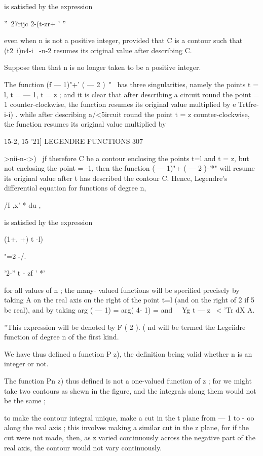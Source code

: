 {is satisfied by the expression

''~27rijc 2-(t-zr+ ' ''

even when n is not a positive integer, provided that C is a contour
such that (t2\ i)n4-i \ -n-2 resumes its original value after
describing C.

Suppose then that n is no longer taken to be a positive integer.

The function (f — 1)"+' ( — 2 )~"~ has three singularities, namely the
points t = l, t = — 1, t = z ; and it is clear that after describing a
circuit round the point = 1 counter-clockwise, the function resumes
its original value multiplied by e Trtfre-i-i) . while after
describing a/<5ircuit round the point t = z counter-clockwise, the
function resumes its original value multiplied by



15-2, 15 '21] LEGENDRE FUNCTIONS 307

  >nii-n-:>) \ jf therefore C be a contour enclosing the points t=l
and t = z, but not enclosing the point = -1, then the function ( —
1)"+ ( — 2 )-'*" will resume its original value after t has described
the contour C. Hence, Legendre's differential equation for functions
of degree n,

/I ,x' * du ,

is satisfied hy the expression

(1+, +) t -l)



"=2 -/.



  '2-'' t - zf ' *'

for all values of n ; the many- valued functions will be specified
precisely by taking A on the real axis on the right of the point t=l
(and on the right of 2 if 5 be real), and by taking arg ( — 1) = arg(
4- 1) = and \ \ Yg t — z \ < 'Tr dX A.

''This expression will be denoted by F ( 2 ). ( nd will be termed the
Legeiidre function of degree n of the first kind.

We have thus defined a function P z), the definition being valid
whether n is an integer or not.

The function Pn z) thus defined is not a one-valued function of z ;
for we might take two contours as shewn in the figure, and the
integrals along them would not be the same ;




to make the contour integral unique, make a cut in the t plane from —
1 to - oo along the real axis ; this involves making a similar cut in
the z plane, for if the cut were not made, then, as z varied
continuously across the negative part of the real axis, the contour
would not vary continuously.

}
